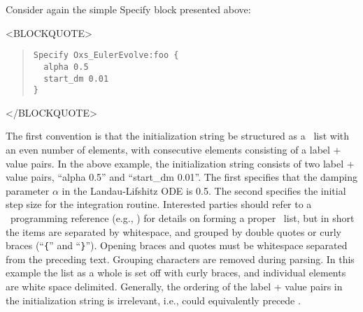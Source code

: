 %
\label{par:specInitString}
Consider again the simple Specify block presented above:
\begin{rawhtml}
<BLOCKQUOTE>
\end{rawhtml}
\begin{quote}
\begin{verbatim}
Specify Oxs_EulerEvolve:foo {
  alpha 0.5
  start_dm 0.01
}
\end{verbatim}
\end{quote}
\begin{rawhtml}
</BLOCKQUOTE>
\end{rawhtml}
The first convention is that the initialization string be structured as
a \Tcl\ list with an even number of elements, with
consecutive elements consisting of a label + value pairs.  In the above
example, the initialization string consists of two label + value pairs,
``alpha 0.5'' and ``start\_dm 0.01''.  The first specifies that the
damping parameter $\alpha$ in the Landau-Lifshitz ODE is 0.5.  The
second specifies the initial step size for the integration routine.
Interested parties should refer to a \Tcl\ programming reference (e.g.,
\cite{welch2000}) for details on forming a proper \Tcl\ list, but in short
the items are separated by whitespace, and grouped by double quotes or
curly braces (``\verb+{+'' and ``\verb+}+'').  Opening braces and quotes
must be whitespace separated from the preceding text.  Grouping
characters are removed during parsing.  In this example the list as a
whole is set off with curly braces, and individual elements are white
space delimited.  Generally, the ordering of the label + value pairs in
the initialization string is irrelevant, i.e.,  could
equivalently precede .


